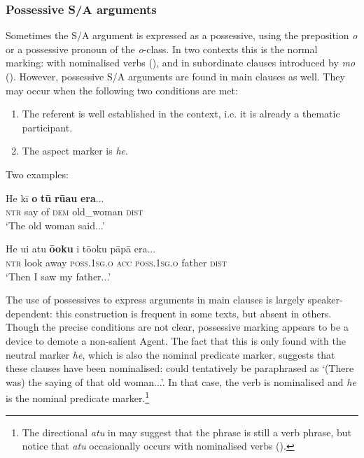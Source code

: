 \subsubsection[Possessive S/A arguments]{Possessive S/A arguments}\label{sec:8.6.4.1}
Sometimes the S/A argument is expressed as a possessive, using the preposition \textit{o} or a possessive pronoun of the \textit{o}{}-class. In two contexts this is the normal marking: with nominalised verbs (), and in subordinate clauses introduced by \textit{mo} (). However, possessive S/A arguments are found in main clauses as well. They may occur when the following two conditions are met:

\begin{enumerate}
\item 
The referent is well established in the context, i.e. it is already a thematic participant.

\item 
The aspect marker is \textit{he}.

\end{enumerate}

Two examples:

\ea\label{ex:8.110}
\gll He kī \textbf{o} \textbf{tū} \textbf{rū{\ꞌ}au} \textbf{era}...\\
\textsc{ntr} say of \textsc{dem} old\_woman \textsc{dist}\\

\glt 
‘The old woman said...’ \textstyleExampleref{[R313.171]} 
\z

\ea\label{ex:8.111}
\gll He u{\ꞌ}i atu \textbf{ō{\ꞌ}oku} i tō{\ꞌ}oku pāpā era...\\
\textsc{ntr} look away \textsc{poss.1sg.o} \textsc{acc} \textsc{poss.1sg.o} father \textsc{dist}\\

\glt
‘Then I saw my father...’ \textstyleExampleref{[R101.012]} 
\z

The use of possessives to express arguments in main clauses is largely speaker-depen\-dent: this construction is frequent in some texts, but absent in others. Though the precise conditions are not clear, possessive marking appears to be a device to demote a non-salient Agent. The fact that this is only found with the neutral marker \textit{he}, which is also the nominal predicate marker, suggests that these clauses have been nominalised:  could tentatively be paraphrased as ‘(There was) the saying of that old woman...’. In that case, the verb is nominalised and \textit{he} is the nominal predicate marker.\footnote{\label{fn:432}The directional \textit{atu} in  may suggest that the phrase is still a verb phrase, but notice that \textit{atu} occasionally occurs with nominalised verbs ().} 

